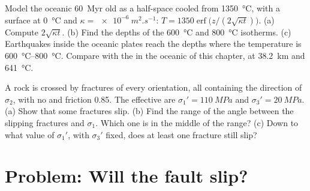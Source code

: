 \begin{exercise}[$\star\star\star$]\label{exo:b1:stress-strain-rheology:11}
Model the oceanic  \qty{60}{Myr} old as a half-space cooled from
\qty{1350}{\degreeCelsius}, with a surface at \qty{0}{\degreeCelsius} and
$\kappa = \qty{e-6}{m^2.s^{-1}}$: $T = \num{1350}\operatorname{erf}\bigl(z/(2\sqrt{\kappa t})\bigr)$.
(a) Compute $2\sqrt{\kappa t}$. (b) Find the depths of the
\qty{600}{\degreeCelsius} and \qty{800}{\degreeCelsius} isotherms. (c) Earthquakes
inside the oceanic plates reach the depths where the temperature is
\qtyrange{600}{800}{\degreeCelsius}. Compare with the  in the oceanic  of this chapter, at
\qty{38.2}{km} and \qty{641}{\degreeCelsius}.
\end{exercise}

\begin{exercise}[$\star\star\star$]\label{exo:b1:stress-strain-rheology:12}
A rock is crossed by fractures of every orientation, all containing the
direction of $\sigma_2$, with no  and friction 0.85. The effective
 are $\sigma_1' = \qty{110}{MPa}$ and
$\sigma_3' = \qty{20}{MPa}$. (a) Show that some fractures slip. (b) Find the
range of the angle between the slipping fractures and $\sigma_1$. Which one is
in the middle of the range? (c) Down to what value of $\sigma_1'$, with
$\sigma_3'$ fixed, does at least one fracture still slip?
\end{exercise}

\section{Problem: Will the fault slip?}

